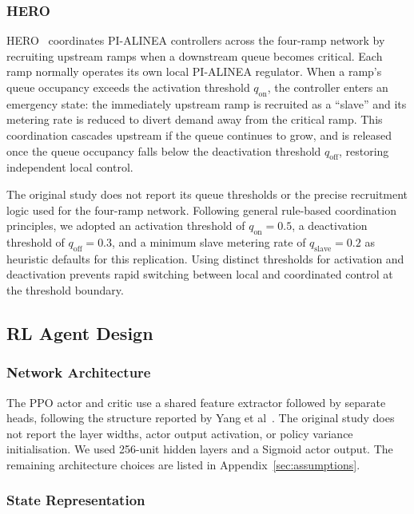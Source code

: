 \subsubsection{HERO}

HERO~\cite{Papamichail2010HERO} coordinates PI-ALINEA controllers across the four-ramp network by recruiting upstream ramps when a downstream queue becomes critical. Each ramp normally operates its own local PI-ALINEA regulator. When a ramp's queue occupancy exceeds the activation threshold $q_\mathrm{on}$, the controller enters an emergency state: the immediately upstream ramp is recruited as a ``slave'' and its metering rate is reduced to divert demand away from the critical ramp. This coordination cascades upstream if the queue continues to grow, and is released once the queue occupancy falls below the deactivation threshold $q_\mathrm{off}$, restoring independent local control.

The original study does not report its queue thresholds or the precise recruitment logic used for the four-ramp network. Following general rule-based coordination principles, we adopted an activation threshold of $q_{\mathrm{on}}=0.5$, a deactivation threshold of $q_{\mathrm{off}}=0.3$, and a minimum slave metering rate of $q_{\mathrm{slave}}=0.2$ as heuristic defaults for this replication. Using distinct thresholds for activation and deactivation prevents rapid switching between local and coordinated control at the threshold boundary.


\subsection{RL Agent Design}

\subsubsection{Network Architecture}

The PPO actor and critic use a shared feature extractor followed by separate heads, following the structure reported by Yang et al~\cite{Yang2025Reinforcement}. The original study does not report the layer widths, actor output activation, or policy variance initialisation. We used 256-unit hidden layers and a Sigmoid actor output. The remaining architecture choices are listed in Appendix~\ref{sec:assumptions}.

\subsubsection{State Representation}

